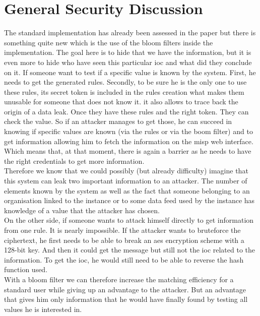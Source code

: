 \documentclass{eplmastersthesis}
\begin{document}
\section{General Security Discussion}
The standard implementation has already been assessed in the paper  but there is something quite new which is the use of the bloom filters inside the implementation.
The goal here is to hide that we have the information, but it is even more to hide who have seen this particular \gls{ioc} and what did they conclude on it.
If someone want to test if a specific value is known by the system. First, he needs to get the generated rules. Secondly, to be sure he is the only one to use these rules, its secret token is included in the rules creation what makes them unusable for someone that does not know it. it also allows to trace back the origin of a data leak.
Once they have these rules and the right token. They can check the value. So if an attacker manages to get those, he can succeed in knowing if specific values are known (via the rules or via the boom filter) and to get information allowing him to fetch the information on the \gls{misp} web interface. Which means that, at that moment, there is again a barrier as he needs to have the right credentials to get more information.\\

Therefore we know that we could possibly (but already difficulty) imagine that this system can leak two important information to an attacker. The number of elements known by the system as well as the fact that someone belonging to an organisation linked to the instance or to some data feed used by the instance has knowledge of a value that the attacker has chosen.\\

On the other side, if someone wants to attack himself directly to get information from one rule. It is nearly impossible. If the attacker wants to bruteforce the ciphertext, he first needs to be able to break an \gls{aes} encryption scheme with a 128-bit key. And then it could get the message but still not the \gls{ioc} related to the information.
To get the \gls{ioc}, he would still need to be able to reverse the hash function used.\\

With a bloom filter we can therefore increase the matching efficiency for a standard user while giving up an advantage to the attacker. But an advantage that gives him only information that he would have finally found by testing all values he is interested in.\\
\end{document}
